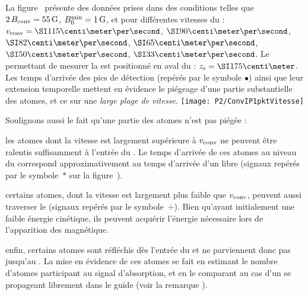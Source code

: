 La figure~ présente des données prises dans des conditions telles que $2\,{B_{\rm conv}}=\SI{55}{{\rm G}}$, ${B_{0}^{\rm min}}=\SI{1}{{\rm G}}$, et pour différentes vitesses du \conv : $\vconv = \cmps{115}$, $\cmps{90}$, $\cmps{82}$, $\cmps{65}$, $\cmps{50}$, $\cmps{33}$. Le \lsonde permettant de mesurer la \datlin est positionné  en aval du \conv : $\zsonde=\cm{175}$. 
Les temps d'arrivée des pics de détection (repérés par le symbole $\bullet$) ainsi que leur extension temporelle mettent en évidence le piégeage d'une partie substantielle des atomes, et ce sur une \emph{large plage de vitesse}. 
\bfighss
\texttt{[image: P2/ConvIP1pktVitesse]}
\label{fig:ConvIP1pktVitesse}
\efigh

\casse

\noindent Soulignons aussi le fait qu'une partie des atomes n'est pas piégée 
:
\begin{ditemize}
	\item les atomes dont la vitesse est largement supérieure à ${v_{\rm conv}}$  ne peuvent être ralentis suffisamment à l'entrée du \tp. Le temps d'arrivée de ces atomes au niveau du \lsonde correspond approximativement au temps d'arrivée d'un \pat libre (signaux repérés par le symbole~$\ast$ sur la figure~).
	\vspace{0.5ex}
	\item {}%
	\vspace{0.8ex}
	certains atomes, dont la vitesse est largement plus faible que ${v_{\rm conv}}$, peuvent aussi traverser le \tp (signaux repérés par le symbole~$\div$). Bien qu'ayant initialement une faible énergie cinétique, ils peuvent acquérir l'énergie nécessaire lors de l'apparition des \bapots magnétique.%
	\item enfin, certains atomes sont réfléchis dès l'entrée du \tp et ne parviennent donc pas jusqu'au \lsonde. La mise en évidence de ces atomes se fait en estimant le nombre d'atomes participant au signal d'absorption, et en le comparant au cas d'un \pat se propageant librement dans le guide (voir la remarque ).
\end{ditemize}

